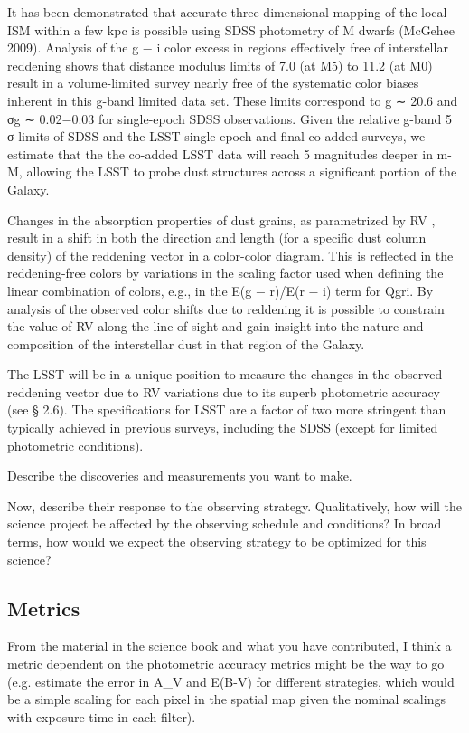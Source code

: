 It has been demonstrated that accurate three-dimensional mapping of the local ISM within a few
kpc is possible using SDSS photometry of M dwarfs (McGehee 2009). Analysis of the g − i color
excess in regions effectively free of interstellar reddening shows that distance modulus limits of 7.0
(at M5) to 11.2 (at M0) result in a volume-limited survey nearly free of the systematic color biases
inherent in this g-band limited data set.
These limits correspond to g ∼ 20.6 and σg ∼ 0.02−0.03 for single-epoch SDSS observations. Given
the relative g-band 5 σ limits of SDSS and the LSST single epoch and final co-added surveys, we
estimate that the the co-added LSST data will reach 5 magnitudes deeper in m-M, allowing the
LSST to probe dust structures across a significant portion of the Galaxy. 


Changes in the absorption properties of dust grains, as parametrized by RV , result in a shift in
both the direction and length (for a specific dust column density) of the reddening vector in a
color-color diagram. This is reflected in the reddening-free colors by variations in the scaling factor
used when defining the linear combination of colors, e.g., in the E(g − r)/E(r − i) term for Qgri.
By analysis of the observed color shifts due to reddening it is possible to constrain the value of RV
along the line of sight and gain insight into the nature and composition of the interstellar dust in
that region of the Galaxy.

The LSST will be in a unique position to measure the changes in the observed reddening vector
due to RV variations due to its superb photometric accuracy (see § 2.6). The specifications for
LSST are a factor of two more stringent than typically achieved in previous surveys, including the
SDSS (except for limited photometric conditions).


Describe the discoveries and measurements you want to make.

Now, describe their response to the observing strategy. Qualitatively,
how will the science project be affected by the observing schedule and
conditions? In broad terms, how would we expect the observing strategy
to be optimized for this science?



\subsection{Metrics}
\label{sec:\secname:metrics}
 From the material in the science book and what you have contributed, I think a metric dependent on the photometric accuracy metrics might be the way to go (e.g. estimate the error in A_V and E(B-V) for different strategies, which would be a simple scaling for each pixel in the spatial map given the nominal scalings with exposure time in each filter).

